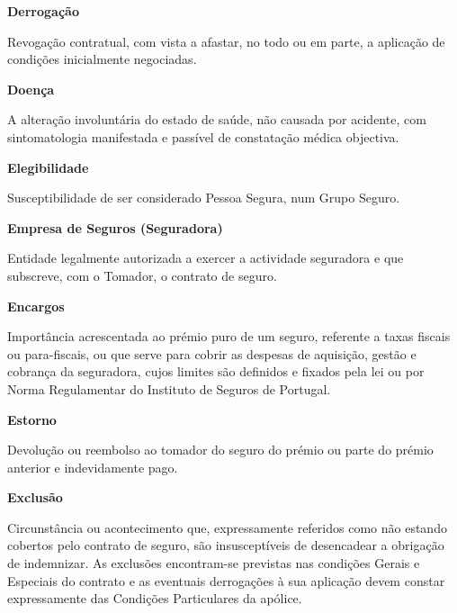\begin{description}
\item \textbf{Derrogação}

Revogação contratual, com vista a afastar, no todo ou em parte, a aplicação de condições inicialmente negociadas.
\end{description}

\begin{description}
\item \textbf{Doença}

A alteração involuntária do estado de saúde, não causada por acidente, com sintomatologia manifestada e passível de constatação médica objectiva.
\end{description}

\begin{description}
\item \textbf{Elegibilidade}

Susceptibilidade de ser considerado Pessoa Segura, num Grupo Seguro.
\end{description}

\begin{description}
\item \textbf{Empresa de Seguros (Seguradora)}

Entidade legalmente autorizada a exercer a actividade seguradora e que subscreve, com o Tomador, o contrato de seguro.
\end{description}

\begin{description}
\item \textbf{Encargos}

Importância acrescentada ao prémio puro de um seguro, referente a taxas fiscais ou para-fiscais, ou que serve para cobrir as despesas de aquisição, gestão e cobrança da seguradora, cujos limites são definidos e fixados pela lei ou por Norma Regulamentar do Instituto de Seguros de Portugal.\end{description}

\begin{description}
\item \textbf{Estorno}

Devolução ou reembolso ao tomador do seguro do prémio ou parte do prémio anterior e indevidamente pago.
\end{description}

\begin{description}
\item \textbf{Exclusão}

Circunstância ou acontecimento que, expressamente referidos como não estando cobertos pelo contrato de seguro, são insusceptíveis de desencadear a obrigação de indemnizar. As exclusões encontram-se previstas nas condições Gerais e Especiais do contrato e as eventuais derrogações à sua aplicação devem constar expressamente das Condições Particulares da apólice.
\end{description}

